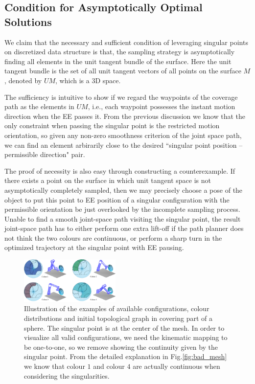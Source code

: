 \documentclass[Afour,sageh,times]{sagej}
\begin{document}
\subsection{Condition for Asymptotically Optimal Solutions}\label{subsection_asymptotical}
We claim that the necessary and sufficient condition of leveraging singular points on discretized data structure is that, the sampling strategy is asymptotically finding all elements in the unit tangent bundle of the surface. Here the unit tangent bundle is the set of all unit tangent vectors of all points on the surface $M$, denoted by $UM$, which is a 3D space. 

The sufficiency is intuitive to show if we regard the waypoints of the coverage path as the elements in $UM$, i.e., each waypoint possesses the instant motion direction when the EE passes it. 
From the previous discussion we know that the only constraint when passing the singular point is the restricted motion orientation, so given any non-zero smoothness criterion of the joint space path, we can find an element arbirarily close to the desired ``singular point position -- permissible direction" pair. 

The proof of necessity is also easy through constructing a counterexample. If there exists a point on the surface in which unit tangent space is not asymptotically completely sampled, then we may precisely choose a pose of the object to put this point to EE position of a singular configuration with the permissible orientation be just overlooked by the incomplete sampling process. Unable to find a smooth joint-space path visiting the singular point, the result joint-space path has to either perform one extra lift-off if the path planner does not think the two colours are continuous, or perform a sharp turn in the optimized trajectory at the singular point with EE pausing.

\begin{figure}[t]
\centering
\includegraphics[width = 0.44\textwidth]{figures/exp_central_sphere/ground_truth_demo_color_2}
\caption{Illustration of the examples of available configurations, colour distributions and initial topological graph in covering part of a sphere. 
The singular point is at the center of the mesh. 
In order to visualize all valid configurations, we need the kinematic mapping to be one-to-one, so we remove showing the continuity given by the singular point. 
From the detailed explanation in Fig.\ref{fig:bad_mesh} we know that colour $1$ and colour $4$ are actually continuous when considering the singularities. 
}\label{fig_ground_truth}
\end{figure}
\end{document}
